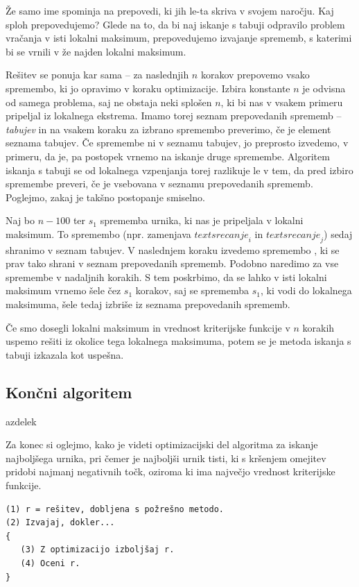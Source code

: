 \documentclass[a4paper,10pt]{article}
\begin{document}
Že samo ime spominja na prepovedi, ki jih le-ta skriva v svojem naročju. Kaj sploh prepovedujemo?
Glede na to, da bi naj iskanje s tabuji odpravilo problem vračanja v isti lokalni maksimum,
prepovedujemo izvajanje sprememb, s katerimi bi se vrnili v že najden lokalni maksimum.

Rešitev se ponuja kar sama -- za naslednjih $n$ korakov prepovemo vsako spremembo, ki jo
opravimo v koraku optimizacije. Izbira konstante $n$ je odvisna od samega problema, saj
ne obstaja neki splošen $n$, ki bi nas v vsakem primeru pripeljal iz lokalnega ekstrema.
Imamo torej seznam prepovedanih sprememb -- \emph{tabujev} in na vsakem koraku za izbrano
spremembo preverimo, če je element seznama tabujev. Če spremembe ni v seznamu tabujev, jo
preprosto izvedemo, v primeru, da je, pa postopek vrnemo na iskanje druge spremembe.
Algoritem iskanja s tabuji se od lokalnega vzpenjanja torej razlikuje le v tem, da pred
izbiro spremembe preveri, če je vsebovana v seznamu prepovedanih sprememb. Poglejmo, zakaj
je takšno postopanje smiselno.

Naj bo $n-100$ ter $s_{1}$ sprememba urnika, ki nas je pripeljala v lokalni maksimum. To
spremembo (npr. zamenjava $text{srecanje}_i$ in $text{srecanje}_j$) sedaj shranimo v
seznam tabujev. V naslednjem koraku izvedemo spremembo , ki se prav tako shrani v
seznam prepovedanih sprememb. Podobno naredimo za vse spremembe v nadaljnih korakih. S
tem poskrbimo, da se lahko v isti lokalni maksimum vrnemo šele čez $s_{1}$ korakov, saj
se sprememba $s_{1}$, ki vodi do lokalnega maksimuma, šele tedaj izbriše iz seznama
prepovedanih sprememb.

Če smo dosegli lokalni maksimum in vrednost kriterijske funkcije v $n$ korakih uspemo
rešiti iz okolice tega lokalnega maksimuma, potem se je metoda iskanja s tabuji izkazala
kot uspešna.

\subsection{Končni algoritem }azdelek

Za konec si oglejmo, kako je videti optimizacijski del algoritma za iskanje najboljšega
urnika, pri čemer je najboljši urnik tisti, ki s kršenjem omejitev pridobi najmanj negativnih
točk, oziroma ki ima največjo vrednost kriterijske funkcije.

\begin{verbatim}
(1) r = rešitev, dobljena s požrešno metodo.
(2) Izvajaj, dokler...
{
   (3) Z optimizacijo izboljšaj r.
   (4) Oceni r.
}
\end{verbatim}
\end{document}
